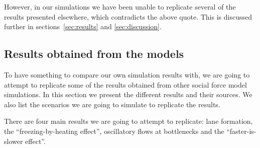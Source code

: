 However, in our simulations we have been unable to replicate several of the 
results presented elsewhere, which contradicts the above quote. This is 
discussed further in sections~\ref{sec:results} and \ref{sec:discussion}.


\subsection{Results obtained from the models}
\label{sec:article-results}
To have something to compare our own simulation results with, we are going to 
attempt to replicate some of the results obtained from other social force 
model simulations. In this section we present the different results and their 
sources. We also list the scenarios we are going to simulate to replicate the 
results.

There are four main results we are going to attempt to replicate: lane 
formation, the ``freezing-by-heating effect'', oscillatory flows at 
bottlenecks and the ``faster-is-slower effect''.


